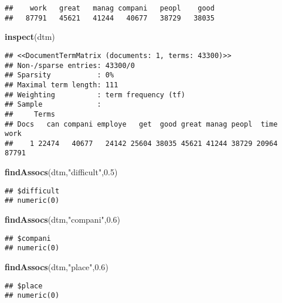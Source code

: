 \documentclass[]{article}
\newenvironment{Shaded}{\begin{snugshade}}{\end{snugshade}}
\newcommand{\KeywordTok}[1]{\textcolor[rgb]{0.13,0.29,0.53}{\textbf{#1}}}
\newcommand{\FloatTok}[1]{\textcolor[rgb]{0.00,0.00,0.81}{#1}}
\newcommand{\StringTok}[1]{\textcolor[rgb]{0.31,0.60,0.02}{#1}}
\newcommand{\NormalTok}[1]{#1}
\begin{document}
\begin{verbatim}
##    work   great   manag compani   peopl    good 
##   87791   45621   41244   40677   38729   38035
\end{verbatim}

\begin{Shaded}
\begin{Highlighting}[]
\KeywordTok{inspect}\NormalTok{(dtm)}
\end{Highlighting}
\end{Shaded}

\begin{verbatim}
## <<DocumentTermMatrix (documents: 1, terms: 43300)>>
## Non-/sparse entries: 43300/0
## Sparsity           : 0%
## Maximal term length: 111
## Weighting          : term frequency (tf)
## Sample             :
##     Terms
## Docs   can compani employe   get  good great manag peopl  time  work
##    1 22474   40677   24142 25604 38035 45621 41244 38729 20964 87791
\end{verbatim}

\begin{Shaded}
\begin{Highlighting}[]
\KeywordTok{findAssocs}\NormalTok{(dtm,}\StringTok{"difficult"}\NormalTok{,}\FloatTok{0.5}\NormalTok{)}
\end{Highlighting}
\end{Shaded}

\begin{verbatim}
## $difficult
## numeric(0)
\end{verbatim}

\begin{Shaded}
\begin{Highlighting}[]
\KeywordTok{findAssocs}\NormalTok{(dtm,}\StringTok{"compani"}\NormalTok{,}\FloatTok{0.6}\NormalTok{)}
\end{Highlighting}
\end{Shaded}

\begin{verbatim}
## $compani
## numeric(0)
\end{verbatim}

\begin{Shaded}
\begin{Highlighting}[]
\KeywordTok{findAssocs}\NormalTok{(dtm,}\StringTok{"place"}\NormalTok{,}\FloatTok{0.6}\NormalTok{)}
\end{Highlighting}
\end{Shaded}

\begin{verbatim}
## $place
## numeric(0)
\end{verbatim}
\end{document}
